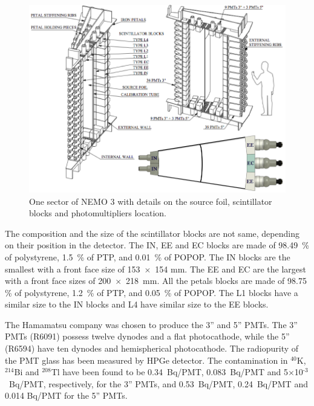 \documentclass[main.tex]{subfiles}
\begin{document}
\begin{figure}[h!]
\begin{center}
\includegraphics[scale=0.34]{pictures/Chap3/SectorDetailedPMTconfig.png}
\caption{One sector of NEMO 3 with details on the source foil, scintillator blocks and photomultipliers location.}
\label{SectorDetailedPMTconfig}
\end{center}
\end{figure}


\NI The composition and the size of the scintillator blocks are not same, depending on their position in the detector. The IN, EE and EC blocks are made of 98.49~\% of polystyrene, 1.5~\% of PTP, and 0.01~\% of POPOP. The IN blocks are the smallest with a front face size of 153~$\times$~154 mm. The EE and EC are the largest with a front face sizes of 200~$\times$~218~mm. All the petals blocks are made of 98.75 \% of polystyrene, 1.2~\% of PTP, and 0.05~\% of POPOP. The L1 blocks have a similar size to the IN blocks and L4 have similar size to the EE blocks. 


\bigskip


\NI The Hamamatsu company was chosen to produce the 3'' and 5'' PMTs. The 3'' PMTs (R6091) possess twelve dynodes and a flat photocathode, while the 5'' (R6594) have ten dynodes and hemispherical photocathode. The radiopurity of the PMT glass has been measured by HPGe detector. The contamination in $^{\text{40}}$K, $^{\text{214}}$Bi and $^{\text{208}}$Tl have been found to be 0.34~Bq/PMT, 0.083~Bq/PMT and 5$\times$10$^{\text{-3}}$~Bq/PMT, respectively, for the 3'' PMTs, and 0.53~Bq/PMT, 0.24~Bq/PMT and 0.014 Bq/PMT for the 5'' PMTs.
\end{document}
